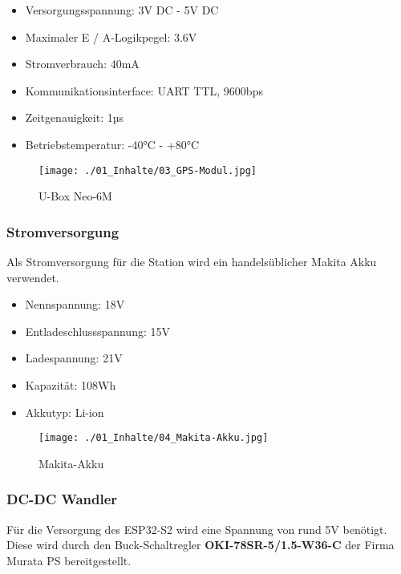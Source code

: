 \begin{minipage}{0.65\textwidth}
	\begin{itemize}
		\item Versorgungsspannung: 3V DC - 5V DC
		\item Maximaler E / A-Logikpegel: 3.6V
		\item Stromverbrauch: 40mA
		\item Kommunikationsinterface: UART TTL, 9600bps
		\item Zeitgenauigkeit: 1µs
		\item Betriebstemperatur: -40°C - +80°C
	\end{itemize}
\end{minipage}%
\begin{minipage}{0.35\textwidth}		
	\begin{figure}[H]
		\texttt{[image: ./01\_Inhalte/03\_GPS-Modul.jpg]}	
		\centering
		\caption{U-Box Neo-6M}
		\label{fig:GPS-Modul}
	\end{figure}
\end{minipage}	



\subsubsection{Stromversorgung}
Als Stromversorgung für die Station wird ein handelsüblicher Makita Akku verwendet.

\begin{minipage}{0.6\textwidth}
	\begin{itemize}
		\item Nennspannung: 18V
		\item Entladeschlussspannung: 15V
		\item Ladespannung: 21V 
		\item Kapazität: 108Wh
		\item Akkutyp: Li-ion
	\end{itemize}
\end{minipage}%
\begin{minipage}{0.4\textwidth}		
	\begin{figure}[H]
		\texttt{[image: ./01\_Inhalte/04\_Makita-Akku.jpg]}	
		\centering
		\caption{Makita-Akku}
		\label{fig:Makita-Akku}
	\end{figure}
\end{minipage}	

\subsubsection{DC-DC Wandler}
Für die Versorgung des ESP32-S2 wird eine Spannung von rund 5V benötigt. Diese wird durch den Buck-Schaltregler \textbf{OKI-78SR-5/1.5-W36-C} der Firma Murata PS bereitgestellt.


